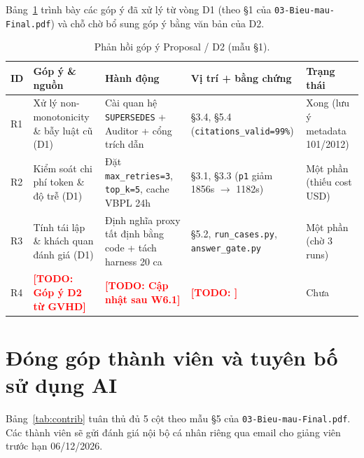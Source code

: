 \documentclass[sigconf,nonacm]{acmart}
\newcommand{\TODO}[1]{\textcolor{red}{\textbf{[TODO: #1]}}}
\begin{document}
Bảng~\ref{tab:feedback} trình bày các góp ý đã xử lý từ vòng D1 (theo §1 của \texttt{03-Bieu-mau-Final.pdf}) và chỗ chờ bổ sung góp ý bằng văn bản của D2.

\begin{table}[H]
\caption{Phản hồi góp ý Proposal / D2 (mẫu §1).}
\label{tab:feedback}
\scriptsize
\begin{tabular}{@{}p{0.5cm}p{1.9cm}p{2.0cm}p{2.1cm}p{0.9cm}@{}}
\toprule
\textbf{ID} & \textbf{Góp ý \& nguồn} & \textbf{Hành động} & \textbf{Vị trí + bằng chứng} & \textbf{Trạng thái} \\
\midrule
R1 & Xử lý non-monotonicity \& bẫy luật cũ (D1) & Cài quan hệ \texttt{SUPERSEDES} + Auditor + cổng trích dẫn & §3.4, §5.4 (\texttt{citations\_valid=99\%}) & Xong (lưu ý metadata 101/2012) \\
R2 & Kiểm soát chi phí token \& độ trễ (D1) & Đặt \texttt{max\_retries=3}, \texttt{top\_k=5}, cache VBPL 24h & §3.1, §3.3 (\texttt{p1} giảm 1856s $\to$ 1182s) & Một phần (thiếu cost USD) \\
R3 & Tính tái lập \& khách quan đánh giá (D1) & Định nghĩa proxy tất định bằng code + tách harness 20 ca & §5.2, \texttt{run\_cases.py}, \texttt{answer\_gate.py} & Một phần (chờ 3 runs) \\
R4 & \TODO{Góp ý D2 từ GVHD} & \TODO{Cập nhật sau W6.1} & \TODO{} & Chưa \\
\bottomrule
\end{tabular}
\end{table}

\section{Đóng góp thành viên và tuyên bố sử dụng AI}
\label{app:contrib}

Bảng~\ref{tab:contrib} tuân thủ đủ 5 cột theo mẫu §5 của \texttt{03-Bieu-mau-Final.pdf}. Các thành viên sẽ gửi đánh giá nội bộ cá nhân riêng qua email cho giảng viên trước hạn 06/12/2026.
\end{document}
